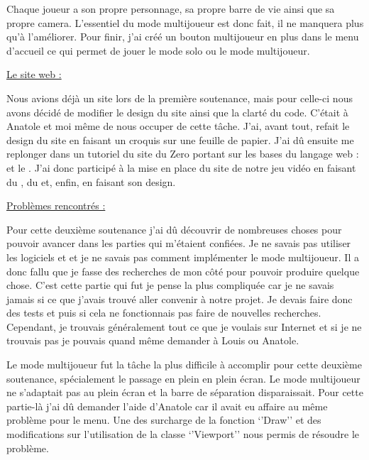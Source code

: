 \documentclass{article}
\begin{document}
\par
Chaque joueur a son propre personnage, sa propre barre de vie ainsi que sa propre camera. L’essentiel du mode multijoueur est donc fait, il ne manquera plus qu’à l’améliorer. Pour finir, j’ai créé un bouton multijoueur en plus dans le menu d’accueil ce qui permet de jouer le mode solo ou le mode multijoueur.
\newline

\underline{Le site web :}
\newline

\par
Nous avions déjà un site lors de la première soutenance, mais pour celle-ci nous avons décidé de modifier le design du site ainsi que la clarté du code. C'était à Anatole et moi même de nous occuper de cette tâche. J'ai, avant tout, refait le design du site en faisant un croquis sur une feuille de papier. J'ai dû  ensuite me replonger dans un tutoriel du site du Zero portant sur les bases du langage web :  et le . J'ai donc participé à la mise en place du site de notre jeu vidéo en faisant du , du  et, enfin, en faisant son design.
\newline

\newpage
\underline{Problèmes rencontrés :}
\newline

\par
Pour cette deuxième soutenance j’ai dû découvrir de nombreuses choses pour pouvoir avancer dans les parties qui m’étaient confiées. Je ne savais pas utiliser les logiciels  et  et je ne savais pas comment implémenter le mode multijoueur. Il a donc fallu que je fasse des recherches de mon côté pour pouvoir produire quelque chose. C’est cette partie qui fut je pense la plus compliquée car je ne savais jamais si ce que j’avais trouvé aller convenir à notre projet. Je devais faire donc des tests et puis si cela ne fonctionnais pas faire de nouvelles recherches. Cependant, je trouvais généralement tout ce que je voulais sur Internet et si je ne trouvais pas je pouvais quand même demander à Louis ou Anatole. 

\par
Le mode multijoueur fut la tâche la plus difficile à accomplir pour cette deuxième soutenance, spécialement le passage en plein en plein écran. Le mode multijoueur ne s’adaptait pas au plein écran et la barre de séparation disparaissait. Pour cette partie-là j’ai dû demander l’aide d’Anatole car il avait eu affaire au même problème pour le menu. Une des surcharge de la fonction ‘’Draw’’ et des modifications sur l’utilisation de la classe ‘’Viewport’’ nous permis de résoudre le problème.
\end{document}
